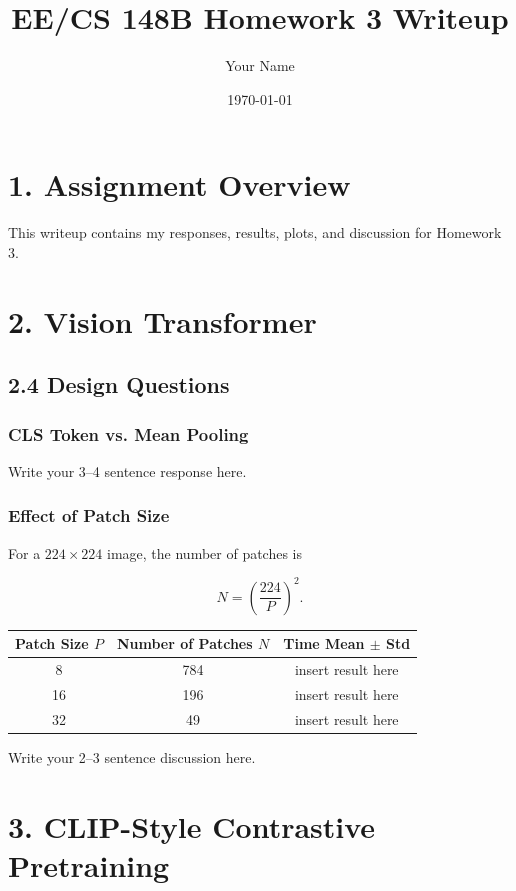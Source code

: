 \documentclass[11pt]{article}
\title{EE/CS 148B Homework 3 Writeup}
\author{Your Name}
\date{\today}
\begin{document}
\maketitle

\section*{1. Assignment Overview}

This writeup contains my responses, results, plots, and discussion for Homework 3.

\section*{2. Vision Transformer}

\subsection*{2.4 Design Questions}

\subsubsection*{CLS Token vs. Mean Pooling}

Write your 3--4 sentence response here.

\subsubsection*{Effect of Patch Size}

For a $224 \times 224$ image, the number of patches is

\[
N = \left(\frac{224}{P}\right)^2.
\]

\begin{center}
\begin{tabular}{c c c}
\toprule
Patch Size $P$ & Number of Patches $N$ & Time Mean $\pm$ Std \\
\midrule
8  & 784 & insert result here \\
16 & 196 & insert result here \\
32 & 49  & insert result here \\
\bottomrule
\end{tabular}
\end{center}

Write your 2--3 sentence discussion here.

\section*{3. CLIP-Style Contrastive Pretraining}
\end{document}

